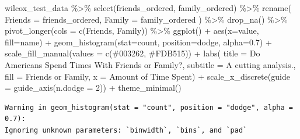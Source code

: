 \documentclass[
  letterpaper,
  DIV=11,
  numbers=noendperiod]{scrreprt}
\newenvironment{Shaded}{\begin{snugshade}}{\end{snugshade}}
\newcommand{\AttributeTok}[1]{\textcolor[rgb]{0.40,0.45,0.13}{#1}}
\newcommand{\DecValTok}[1]{\textcolor[rgb]{0.68,0.00,0.00}{#1}}
\newcommand{\FloatTok}[1]{\textcolor[rgb]{0.68,0.00,0.00}{#1}}
\newcommand{\FunctionTok}[1]{\textcolor[rgb]{0.28,0.35,0.67}{#1}}
\newcommand{\NormalTok}[1]{\textcolor[rgb]{0.00,0.23,0.31}{#1}}
\newcommand{\SpecialCharTok}[1]{\textcolor[rgb]{0.37,0.37,0.37}{#1}}
\newcommand{\StringTok}[1]{\textcolor[rgb]{0.13,0.47,0.30}{#1}}
\begin{document}
\begin{Shaded}
\begin{Highlighting}[]
\NormalTok{wilcox\_test\_data }\SpecialCharTok{\%\textgreater{}\%} 
  \FunctionTok{select}\NormalTok{(friends\_ordered, family\_ordered) }\SpecialCharTok{\%\textgreater{}\%} 
  \FunctionTok{rename}\NormalTok{(}
    \AttributeTok{Friends =}\NormalTok{ friends\_ordered, }
    \AttributeTok{Family  =}\NormalTok{ family\_ordered}
\NormalTok{  ) }\SpecialCharTok{\%\textgreater{}\%} 
  \FunctionTok{drop\_na}\NormalTok{() }\SpecialCharTok{\%\textgreater{}\%} 
  \FunctionTok{pivot\_longer}\NormalTok{(}\AttributeTok{cols =} \FunctionTok{c}\NormalTok{(Friends, Family)) }\SpecialCharTok{\%\textgreater{}\%}   
  \FunctionTok{ggplot}\NormalTok{() }\SpecialCharTok{+} 
    \FunctionTok{aes}\NormalTok{(}\AttributeTok{x=}\NormalTok{value, }\AttributeTok{fill=}\NormalTok{name) }\SpecialCharTok{+} 
    \FunctionTok{geom\_histogram}\NormalTok{(}\AttributeTok{stat=}\StringTok{\textquotesingle{}count\textquotesingle{}}\NormalTok{, }\AttributeTok{position=}\StringTok{\textquotesingle{}dodge\textquotesingle{}}\NormalTok{, }\AttributeTok{alpha=}\FloatTok{0.7}\NormalTok{) }\SpecialCharTok{+} 
  \FunctionTok{scale\_fill\_manual}\NormalTok{(}\AttributeTok{values =} \FunctionTok{c}\NormalTok{(}\StringTok{\textquotesingle{}\#003262\textquotesingle{}}\NormalTok{, }\StringTok{\textquotesingle{}\#FDB515\textquotesingle{}}\NormalTok{)) }\SpecialCharTok{+} 
  \FunctionTok{labs}\NormalTok{(}
    \AttributeTok{title    =} \StringTok{\textquotesingle{}Do Americans Spend Times With Friends or Family?\textquotesingle{}}\NormalTok{,}
    \AttributeTok{subtitle =} \StringTok{\textquotesingle{}A cutting analysis.\textquotesingle{}}\NormalTok{, }
    \AttributeTok{fill     =} \StringTok{\textquotesingle{}Friends or Family\textquotesingle{}}\NormalTok{, }
    \AttributeTok{x        =} \StringTok{\textquotesingle{}Amount of Time Spent\textquotesingle{}}\NormalTok{) }\SpecialCharTok{+} 
  \FunctionTok{scale\_x\_discrete}\NormalTok{(}\AttributeTok{guide =} \FunctionTok{guide\_axis}\NormalTok{(}\AttributeTok{n.dodge =} \DecValTok{2}\NormalTok{)) }\SpecialCharTok{+}
  \FunctionTok{theme\_minimal}\NormalTok{()}
\end{Highlighting}
\end{Shaded}

\begin{verbatim}
Warning in geom_histogram(stat = "count", position = "dodge", alpha = 0.7):
Ignoring unknown parameters: `binwidth`, `bins`, and `pad`
\end{verbatim}
\end{document}
